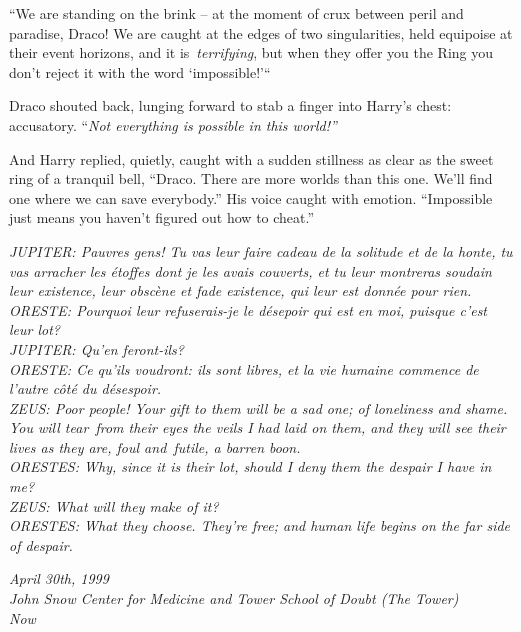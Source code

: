 ``We are standing on the brink -- at the moment of crux between peril
and paradise, Draco! We are caught at the edges of two singularities,
held equipoise at their event horizons, and it is~\emph{terrifying}, but
when they offer you the Ring you don't reject it with the word
`impossible!'``

Draco shouted back, lunging forward to stab a finger into Harry's chest:
accusatory. ``\emph{Not everything is possible in this world!''}

And Harry replied, quietly, caught with a sudden stillness as clear as
the sweet ring of a tranquil bell, ``Draco. There are more worlds than
this one. We'll find one where we can save everybody.'' His voice caught
with emotion. ``Impossible just means you haven't figured out how to
cheat.''

\mybreak

\emph{JUPITER: Pauvres gens! Tu vas leur faire cadeau de la solitude et
de la honte, tu vas arracher les étoffes dont je les avais couverts, et
tu leur montreras soudain leur existence, leur obscène et fade
existence, qui leur est donnée pour rien.}\\
\emph{ORESTE: Pourquoi leur refuserais-je le désepoir qui est en moi,
puisque c'est leur lot?}\\
\emph{JUPITER: Qu'en feront-ils?}\\
\emph{ORESTE: Ce qu'ils voudront: ils sont libres, et la vie humaine
commence de l'autre côté du désespoir.}\\

\emph{ZEUS: Poor people! Your gift to them will be a sad one; of
loneliness and shame. You will tear~from their eyes the veils I had laid
on them, and they will see their lives as they are, foul and~futile, a
barren boon.}\\
\emph{ORESTES: Why, since it is their lot, should I deny them the
despair I have in me?}\\
\emph{ZEUS: What will they make of it?}\\
\emph{ORESTES: What they choose. They're free; and human life begins on
the far side of despair.}\\


\mybreak

\emph{April 30th, 1999}\\
\emph{John Snow Center for Medicine and Tower School of Doubt (The
Tower)}\\
\emph{Now}\\


